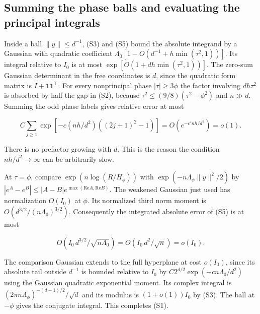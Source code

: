 \subsection{Summing the phase balls and evaluating the principal integrals}

Inside a ball $\|y\|\le d^{-1}$, (S3) and (S5) bound the absolute integrand by a Gaussian with quadratic coefficient $\Lambda_0[1-O(d^{-1}+h\min(\tau^2,1))]$. Its integral relative to $I_0$ is at most $\exp[O(1+dh\min(\tau^2,1))]$. The zero-sum Gaussian determinant in the free coordinates is $d$, since the quadratic form matrix is $I+\mathbf1\mathbf1^\top$. For every nonprincipal phase $|\tau|\ge3\phi$ the factor involving $dh\tau^2$ is absorbed by half the gap in (S2), because $\tau^2\le(9/8)(\tau^2-\phi^2)$ and $n\gg d$. Summing the odd phase labels gives relative error at most

\begin{equation*}
C\sum_{j\ge1}\exp[-c(nh/d^2)((2j+1)^2-1)]
=O(e^{-c'nh/d^2})=o(1).
\end{equation*}

There is no prefactor growing with $d$. This is the reason the condition $nh/d^2\to\infty$ can be arbitrarily slow.

At $\tau=\phi$, compare $\exp(n\log(R/H_\phi))$ with $\exp(-n\Lambda_\phi\|y\|^2/2)$ by $|e^A-e^B|\le |A-B|e^{\max(\mathrm{Re} A,\mathrm{Re} B)}$. The weakened Gaussian just used has normalization $O(I_0)$ at $\phi$. Its normalized third norm moment is $O(d^{3/2}/(n\Lambda_0)^{3/2})$. Consequently the integrated absolute error of (S5) is at most

\begin{equation*}
O(I_0\,d^{3/2}/\sqrt{n\Lambda_0})
=O(I_0\,d^2/\sqrt n)
=o(I_0).
\end{equation*}

The comparison Gaussian extends to the full hyperplane at cost $o(I_0)$, since its absolute tail outside $d^{-1}$ is bounded relative to $I_0$ by $C2^{d/2}\exp(-c n\Lambda_0/d^2)$ using the Gaussian quadratic exponential moment. Its complex integral is $(2\pi n\Lambda_\phi)^{-(d-1)/2}/\sqrt d$ and its modulus is $(1+o(1))I_0$ by (S3). The ball at $-\phi$ gives the conjugate integral. This completes (S1).

